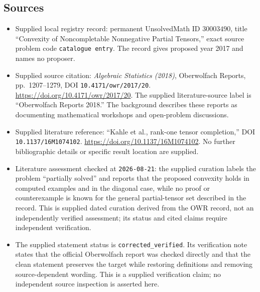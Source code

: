 \documentclass[11pt]{article}
\begin{document}
\subsection{Sources}
\begin{itemize}
\item Supplied local registry record: permanent UnsolvedMath ID \(30003490\), title ``Convexity of Noncompletable Nonnegative Partial Tensors,'' exact source problem code \texttt{catalogue entry}. The record gives proposed year 2017 and names no proposer.
\item Supplied source citation: \emph{Algebraic Statistics (2018)}, Oberwolfach Reports, pp.\ 1207--1279, DOI \texttt{10.4171/owr/2017/20}. \url{https://doi.org/10.4171/owr/2017/20}. The supplied literature-source label is ``Oberwolfach Reports 2018.'' The background describes these reports as documenting mathematical workshops and open-problem discussions.
\item Supplied literature reference: ``Kahle et al., rank-one tensor completion,'' DOI \texttt{10.1137/16M1074102}. \url{https://doi.org/10.1137/16M1074102}. No further bibliographic details or specific result location are supplied.
\item Literature assessment checked at \texttt{2026-08-21}: the supplied curation labels the problem ``partially solved'' and reports that the proposed convexity holds in computed examples and in the diagonal case, while no proof or counterexample is known for the general partial-tensor set described in the record. This is supplied dated curation derived from the OWR record, not an independently verified assessment; its status and cited claims require independent verification.
\item The supplied statement status is \texttt{corrected\_verified}. Its verification note states that the official Oberwolfach report was checked directly and that the clean statement preserves the target while restoring definitions and removing source-dependent wording. This is a supplied verification claim; no independent source inspection is asserted here.
\end{itemize}
\end{document}
